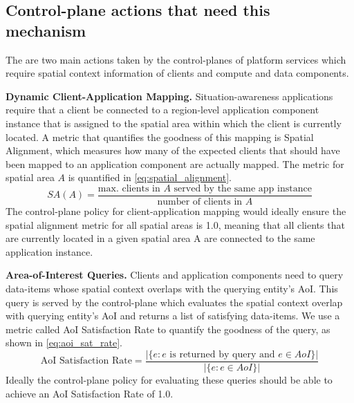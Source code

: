 \subsection{Control-plane actions that need this mechanism}
The are two main actions taken by the control-planes of platform services which require spatial context information of clients and compute and data components.
\par \noindent \textbf{Dynamic Client-Application Mapping. } Situation-awareness applications require that a client be connected to a region-level application component instance that is assigned to the spatial area within which the client is currently located. A metric that quantifies the goodness of this mapping is Spatial Alignment, which measures how many of the expected clients that should have been mapped to an application component are actually mapped. The metric for spatial area $A$ is quantified in \cref{eq:spatial_alignment}.
\begin{equation}
SA \left( A \right) = \dfrac{\text{max. clients in }A\text{ served by the same app instance}}{\text{number of clients in }A}
\label{eq:spatial_alignment}
\end{equation}
The control-plane policy for client-application mapping would ideally ensure the spatial alignment metric for all spatial areas is 1.0, meaning that all clients that are currently located in a given spatial area A are connected to the same application instance.

\par \noindent \textbf{Area-of-Interest Queries. } Clients and application components need to query data-items whose spatial context overlaps with the querying entity's AoI. This query is served by the control-plane which evaluates the spatial context overlap with querying entity's AoI and returns a list of satisfying data-items. We use a metric called AoI Satisfaction Rate to quantify the goodness of the query, as shown in \cref{eq:aoi_sat_rate}.
\begin{equation}
\text{AoI Satisfaction Rate} = \dfrac{|\{ e: e \text{ is returned by query  and } e \in AoI \}|}{|\{ e: e \in AoI \}|}
\label{eq:aoi_sat_rate}
\end{equation}
Ideally the control-plane policy for evaluating these queries should be able to achieve an AoI Satisfaction Rate of 1.0.



